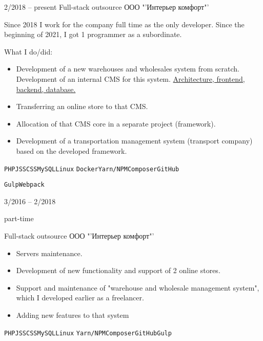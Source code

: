 

\begin{entrylist}
	\entry
		{2/2018 -- present}
		{Full-stack outsource}
		{ООО "'Интерьер комфорт"' }
		{Since 2018 I work for the company full time as the only developer. Since the beginning of 2021, I got 1 programmer as a subordinate.

    What I do/did:
    \begin{itemize}
      \item Development of a new warehouses and wholesales system from scratch. Development of an internal CMS for this system. \underline{Architecture, frontend, backend, database.}
      \item Transferring an online store to that CMS.
      \item Allocation of that CMS core in a separate project (framework).
      \item Development of a transportation management system (transport company) based on the developed framework.
    \end{itemize}

		\texttt{PHP}\slashsep\texttt{JS}\slashsep\texttt{SCSS}\slashsep\texttt{MySQL}\slashsep\texttt{Linux}
    \slashsep\texttt{Docker}\slashsep\texttt{Yarn/NPM}\slashsep\texttt{Composer}\slashsep\texttt{GitHub}

    \texttt{Gulp}\slashsep\texttt{Webpack}}

	\entry
		{3/2016 -- 2/2018

		\footnotesize{part-time}}
		{Full-stack outsource}
		{ООО "'Интерьер комфорт"' }
		{
    \begin{itemize}
      \item Servers maintenance.
      \item Development of new functionality and support of 2 online stores.
      \item Support and maintenance of "warehouse and wholesale management system", which I developed earlier as a freelancer.
      \item Adding new features to that system
    \end{itemize}

		\texttt{PHP}\slashsep\texttt{JS}\slashsep\texttt{SCSS}\slashsep\texttt{MySQL}\slashsep\texttt{Linux}
    \slashsep\texttt{Yarn/NPM}\slashsep\texttt{Composer}\slashsep\texttt{GitHub}\slashsep\texttt{Gulp}
    }


\end{entrylist}
